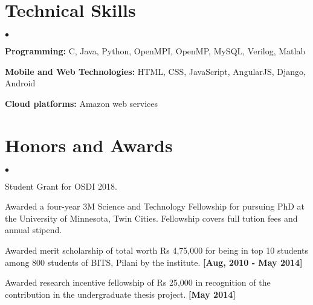 \documentclass[margin,line]{res}
\newenvironment{list2}{
  \begin{list}{$\bullet$}{%
      \setlength{\itemsep}{0in}
      \setlength{\parsep}{0in} \setlength{\parskip}{0in}
      \setlength{\topsep}{0in} \setlength{\partopsep}{0in} 
      \setlength{\leftmargin}{0.2in}}}{\end{list}}
\begin{document}
\begin{resume}
\section{\sc Technical Skills} 
\begin{list2}

\item {\bf Programming:} C, Java, Python, OpenMPI, OpenMP, MySQL, Verilog, Matlab
\item {\bf Mobile and Web Technologies:} HTML, CSS, JavaScript, AngularJS, Django, Android
\item {\bf Cloud platforms:} Amazon web services
\end{list2}
 

\section{\sc Honors and Awards}
\begin{list2}
\item Student Grant for OSDI 2018.
\item Awarded a four-year 3M Science and Technology Fellowship for pursuing PhD at the University of Minnesota, Twin Cities. Fellowship covers full tution fees and annual stipend.
\item Awarded merit scholarship of total worth Rs 4,75,000 for being in top 10 students among 800 students of BITS, Pilani by the institute. {\bf [Aug, 2010 - May 2014]}

\item Awarded research incentive fellowship of Rs 25,000 in recognition of the contribution in the
undergraduate thesis project. {\bf [May 2014]}

\end{list2}

\end{resume}
\end{document}
